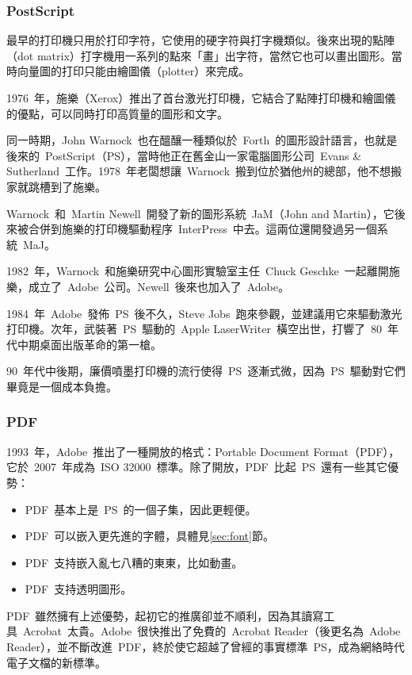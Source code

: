 \subsubsection{PostScript}
最早的打印機只用於打印字符，它使用的硬字符與打字機類似。後來出現的點陣（dot matrix）打字機用一系列的點來「畫」出字符，當然它也可以畫出圖形。當時向量圖的打印只能由繪圖儀（plotter）來完成。

1976~年，施樂（Xerox）推出了首台激光打印機，它結合了點陣打印機和繪圖儀的優點，可以同時打印高質量的圖形和文字。

同一時期，John Warnock~也在醞釀一種類似於~Forth~的圖形設計語言，也就是後來的~PostScript（PS），當時他正在舊金山一家電腦圖形公司~Evans \& Sutherland~工作。1978~年老闆想讓~Warnock~搬到位於猶他州的總部，他不想搬家就跳槽到了施樂。

Warnock~和~Martin Newell~開發了新的圖形系統~JaM（John and Martin），它後來被合併到施樂的打印機驅動程序~InterPress~中去。這兩位還開發過另一個系統~MaJ。

1982~年，Warnock~和施樂研究中心圖形實驗室主任~Chuck Geschke~一起離開施樂，成立了~Adobe~公司。Newell~後來也加入了~Adobe。

1984~年~Adobe~發佈~PS~後不久，Steve Jobs~跑來參觀，並建議用它來驅動激光打印機。次年，武裝著~PS~驅動的~Apple LaserWriter~橫空出世，打響了~80~年代中期桌面出版革命的第一槍。

90~年代中後期，廉價噴墨打印機的流行使得~PS~逐漸式微，因為~PS~驅動對它們畢竟是一個成本負擔。

\subsubsection{PDF}
1993~年，Adobe~推出了一種開放的格式：Portable Document Format（PDF），它於~2007~年成為~ISO 32000~標準。除了開放，PDF~比起~PS~還有一些其它優勢：
\begin{itemize}
    \item PDF~基本上是~PS~的一個子集，因此更輕便。
    \item PDF~可以嵌入更先進的字體，具體見\ref{sec:font}節。
    \item PDF~支持嵌入亂七八糟的東東，比如動畫。
    \item PDF~支持透明圖形。
\end{itemize}

PDF~雖然擁有上述優勢，起初它的推廣卻並不順利，因為其讀寫工具~Acrobat~太貴。Adobe~很快推出了免費的~Acrobat Reader（後更名為~Adobe Reader），並不斷改進~PDF，終於使它超越了曾經的事實標準~PS，成為網絡時代電子文檔的新標準。

